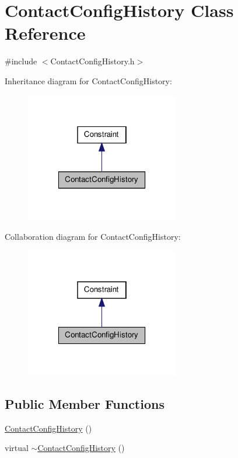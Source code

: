 \hypertarget{classContactConfigHistory}{\section{\-Contact\-Config\-History \-Class \-Reference}
\label{classContactConfigHistory}
}


{\ttfamily \#include $<$\-Contact\-Config\-History.\-h$>$}



\-Inheritance diagram for \-Contact\-Config\-History\-:
\nopagebreak
\begin{figure}[H]
\begin{center}
\leavevmode
\includegraphics[width=190pt]{classContactConfigHistory__inherit__graph}
\end{center}
\end{figure}


\-Collaboration diagram for \-Contact\-Config\-History\-:
\nopagebreak
\begin{figure}[H]
\begin{center}
\leavevmode
\includegraphics[width=190pt]{classContactConfigHistory__coll__graph}
\end{center}
\end{figure}
\subsection*{\-Public \-Member \-Functions}
\begin{DoxyCompactItemize}
\item 
\hyperlink{classContactConfigHistory_aa2ff8c4c2b05ca2168c5ea61bfbeb9ec}{\-Contact\-Config\-History} ()
\item 
virtual \hyperlink{classContactConfigHistory_a2b84c6e1ed477c052a18c0933c3988cf}{$\sim$\-Contact\-Config\-History} ()
\end{DoxyCompactItemize}
